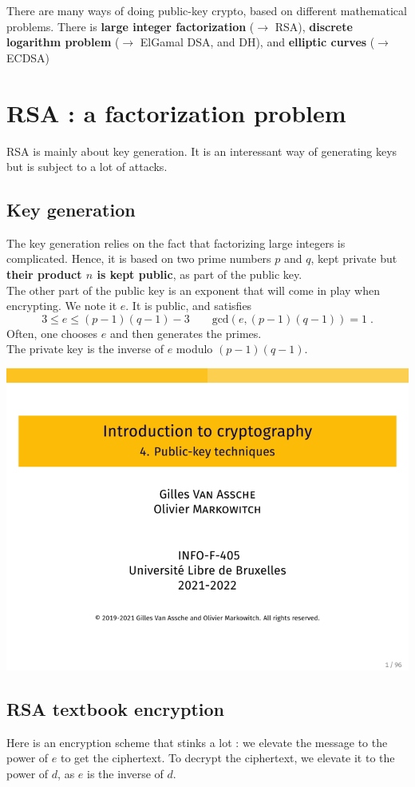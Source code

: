 \documentclass[../Cryptography.tex]{subfiles}
\begin{document}
There are many ways of doing public-key crypto, based on different mathematical problems. There is \textbf{large integer factorization} ($\rightarrow$ RSA), \textbf{discrete logarithm problem} ($\rightarrow$ ElGamal DSA, and DH), and \textbf{elliptic curves} ($\rightarrow$ ECDSA)
\section{RSA : a factorization problem}
RSA is mainly about key generation. It is an interessant way of generating keys but is subject to a lot of attacks. 
\subsection{Key generation}
The key generation relies on the fact that factorizing large integers is complicated. Hence, it is based on two prime numbers $p$ and $q$, kept private but \textbf{their product $n$ is kept public}, as part of the public key. \\

The other part of the public key is an exponent that will come in play when encrypting. We note it $e$. It is public, and satisfies $$3 \leq e \leq (p-1)(q-1) - 3 \qquad \mathrm{gcd}(e, (p-1)(q-1)) = 1 \; .$$
Often, one chooses $e$ and then generates the primes. \\

The private key is the inverse of $e$ modulo $(p-1)(q-1)$. 

\begin{center}
    \includegraphics[width=0.6\linewidth, page=35]{Slides/4-Public.pdf}
\end{center}

\subsection{RSA textbook encryption}
Here is an encryption scheme that stinks a lot : we elevate the message to the power of $e$ to get the ciphertext. To decrypt the ciphertext, we elevate it to the power of $d$, as $e$ is the inverse of $d$.
\end{document}
